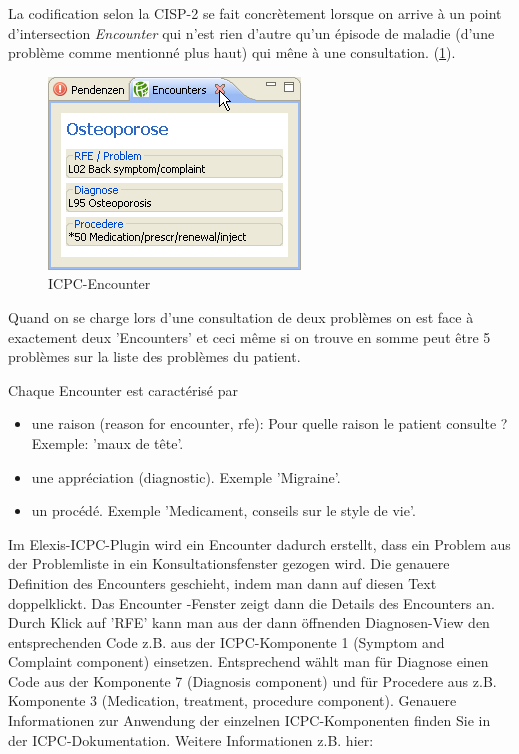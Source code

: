La codification selon la CISP-2 se fait concrètement lorsque on arrive à un point d'intersection \textit{Encounter} qui n'est rien d'autre qu'un épisode de maladie (d'une problème comme mentionné plus haut) qui mêne à une consultation. (\ref{fig:encounter}).\\
\begin{figure}
\includegraphics{images/encounter}
\caption{ICPC-Encounter}
\label{fig:encounter}
\end{figure}
Quand on se charge lors d'une consultation de deux problèmes on est face à exactement deux 'Encounters' et ceci même si on trouve en somme peut être 5 problèmes sur la liste des problèmes du patient.

Chaque Encounter est caractérisé par
\begin{itemize}
\item une raison (reason for encounter, rfe): Pour quelle raison le patient consulte ? Exemple: 'maux de tête'.
\item une appréciation (diagnostic). Exemple 'Migraine'.
\item un procédé. Exemple 'Medicament, conseils sur le style de vie'.
\end{itemize}

\bigskip

Im Elexis-ICPC-Plugin wird ein Encounter dadurch erstellt, dass ein Problem aus der Problemliste in ein Konsultationsfenster gezogen wird. Die genauere Definition des Encounters geschieht, indem man dann auf diesen Text doppelklickt. Das Encounter
-Fenster zeigt dann die Details des Encounters an. Durch Klick auf 'RFE' kann man aus der dann öffnenden Diagnosen-View den entsprechenden Code z.B. aus der ICPC-Komponente 1 (Symptom and Complaint component) einsetzen. Entsprechend wählt man für Diagnose einen Code aus der Komponente 7 (Diagnosis component) und für Procedere aus z.B. Komponente 3 (Medication, treatment, procedure component).
Genauere Informationen zur Anwendung der einzelnen ICPC-Komponenten finden Sie in der ICPC-Dokumentation. Weitere Informationen z.B. hier:

